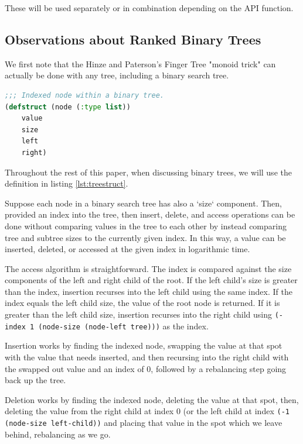 \documentclass[sigconf]{acmart}
\begin{document}
These will be used separately or in combination depending on the API function.

\subsection{Observations about Ranked Binary Trees}

We first note that the Hinze and Paterson's Finger Tree "monoid
trick"\cite{Hinze-Paterson:FingerTree} can actually be done with any tree,
including a binary search tree.

\begin{lstlisting}[caption={Our indexed binary tree type.}, label={lst:treestruct}, language=Lisp]
;;; Indexed node within a binary tree.
(defstruct (node (:type list))
    value
    size
    left
    right)
\end{lstlisting}

Throughout the rest of this paper, when discussing binary trees, we will use
the definition in listing \ref{lst:treestruct}.

Suppose each node in a binary search tree has also a `size` component. Then,
provided an index into the tree, then insert, delete, and access operations can
be done without comparing values in the tree to each other by instead comparing
tree and subtree sizes to the currently given index. In this way, a value
can be inserted, deleted, or accessed at the given index in logarithmic time.

The access algorithm is straightforward. The index is compared against the size
components of the left and right child of the root. If the left child's size
is greater than the index, insertion recurses into the left child using the same
index. If the index equals the left child size, the value of the root node is returned.
If it is greater than the left child size, insertion recurses into the right
child using \texttt{(- index 1 (node-size (node-left tree)))} as the index.

Insertion works by finding the indexed node, swapping the value at that spot
with the value that needs inserted, and then recursing into the right child with
the swapped out value and an index of 0, followed by a rebalancing step going
back up the tree.

Deletion works by finding the indexed node, deleting the value at that spot,
then, deleting the value from the right child at index 0 (or the left child at
index \texttt{(-1 (node-size left-child))} and placing that value in the spot
which we leave behind, rebalancing as we go.
\end{document}
